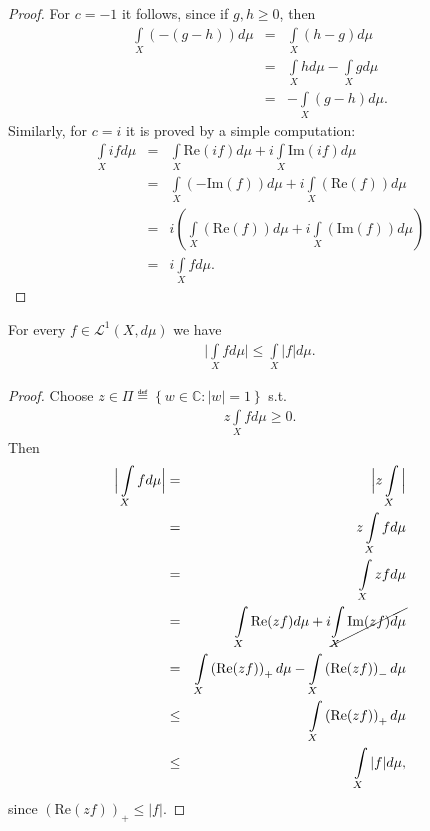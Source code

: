\begin{proof}
    For \(c=-1\) it follows, since if \(g,h\geq0\), then
    \begin{eqnarray*}
        \int\limits_{X}\left( -(g-h) \right)d\mu &=& \int\limits_{X}\left( h-g \right)d\mu \\
        &=& \int\limits_{X} h d\mu - \int\limits_{X} gd\mu \\
        &=& - \int\limits_{X}\left( g- h \right)d\mu.
    \end{eqnarray*}
    Similarly, for \(c=i\) it is proved by a simple computation:
    \begin{eqnarray*}
        \int\limits_{X} i fd\mu &=& \int\limits_{X} \text{Re}(if)d\mu + i\int\limits_{X}\text{Im}(if)d\mu \\
        &=& \int\limits_{X}\left( -\text{Im}(f) \right)d\mu + i \int\limits_{X} \left( \text{Re}(f) \right)d\mu \\
        &=& i\left( \int\limits_{X}\left( \text{Re}(f) \right) d\mu + i\int\limits_{X} \left( \text{Im}(f) \right)d\mu\right) \\
        &=& i\int\limits_{X} fd\mu.
    \end{eqnarray*}
\end{proof}
\begin{prop}
    For every \(f\in \mathcal{L}^{1}(X,d\mu)\) we have
    \begin{align*}
        \Big|\int\limits_{X}fd\mu\Big| \leq \int\limits_{X}|f|d\mu.
    \end{align*}
\end{prop}
\begin{proof}
    Choose \(z\in \Pi\eqdef \left\{ w\in\mathbb{C} : |w|=1 \right\}\) s.t.
    \begin{align*}
        z\int\limits_{X}fd\mu \geq 0.
    \end{align*}
    Then
    \begin{eqnarray*}
        \Big|\int\limits_{X} fd\mu \Big| &=& \Big|z\int\limits_{X}\Big| \\
        &=& z \int\limits_{X}fd\mu \\
        &=& \int\limits_{X}zfd\mu \\
        &=& \int\limits_{X}\text{Re}(zf)d\mu + i \cancel{\int\limits_{X}\text{Im}(zf)d\mu} \\
        &=& \int\limits_{X}\left(\text{Re}(zf)\right)_{+}d\mu - \int\limits_{X}\left(\text{Re}(zf)\right)_{-}d\mu \\
        &\leq& \int\limits_{X}\left(\text{Re}(zf)\right)_{+}d\mu \\
        &\leq& \int\limits_{X}|f|d\mu,
    \end{eqnarray*}
    since \(\left( \text{Re}(zf) \right)_{+} \leq |f|\).
\end{proof}